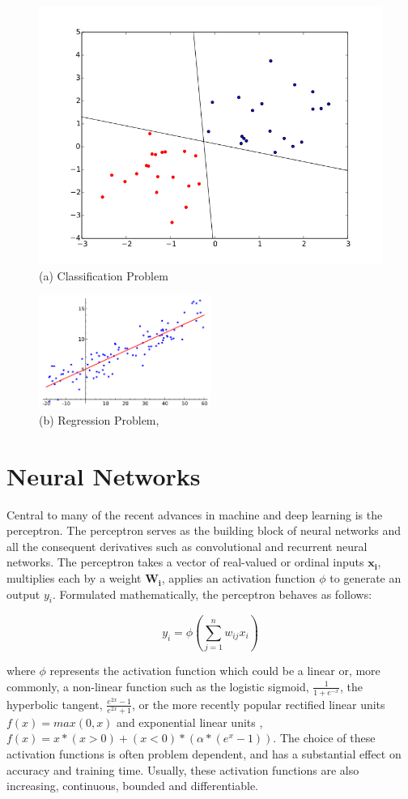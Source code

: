  \begin{figure}
     \centering
     \includegraphics[width=.5\textwidth]{images/KnnClassification}
     \caption{(a) Classification Problem}
     \label{fig:classification}
\end{figure}%

\begin{figure}
     \centering
     \includegraphics[width=0.5\textwidth]{images/Linear_regression}
     \caption{(b) Regression Problem, \cite{reg}}
     \label{fig:regression}
 \end{figure}


 \citep{murphy2012machine}
 \section{Neural Networks}
 Central to many of the recent advances in machine and deep learning is the perceptron. The perceptron serves as the building block of neural networks and all the consequent derivatives such as convolutional and recurrent neural networks. The perceptron takes a vector of real-valued or ordinal inputs $\mathbf{x_i}$, multiplies each by a weight $\mathbf{W_i}$, applies an activation function $\phi$ to generate an output $y_i$. Formulated mathematically, the perceptron behaves as follows:

 \begin{equation}
     y_i = \phi ( \sum_{j=1}^n w_{ij} x_i) 
 \end{equation}

 where $\phi$ represents the activation function which could be a linear or, more commonly, a non-linear function such as the logistic sigmoid, $\frac{1}{1+e^{-x}}$, the hyperbolic tangent, $\frac{e^{2x} -1}{e^{2x} + 1}$, or the more recently popular rectified linear units \citep{nair2010rectified} $f(x) = max(0,x)$ and exponential linear units \citep{clevert2015fast}, $f(x) = x * (x > 0) + (x < 0) * (\alpha * (e^x - 1))$. The choice of these activation functions is often problem dependent, and has a substantial effect on accuracy and training time. Usually, these activation functions are also increasing, continuous, bounded and differentiable.

